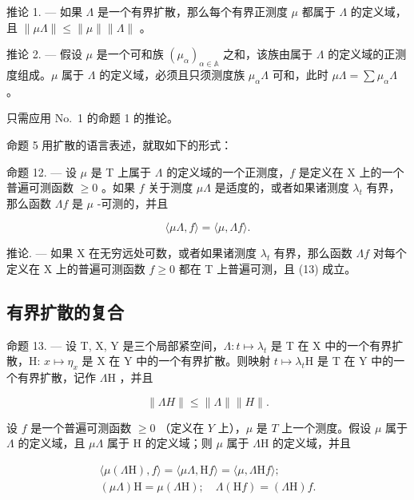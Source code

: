 推论 1. --- 如果 \(\Lambda\) 是一个有界扩散，那么每个有界正测度 \(\mu\) 都属于 \(\Lambda\) 的定义域，且 \(\|\mu\Lambda\| \leqslant \|\mu\|\|\Lambda\|\) 。

推论 2. --- 假设 \(\mu\) 是一个可和族 \((\mu_{\alpha})_{\alpha \in \mathbb{A}}\) 之和，该族由属于 \(\Lambda\) 的定义域的正测度组成。\(\mu\) 属于 \(\Lambda\) 的定义域，必须且只须测度族 \(\mu_{\alpha}\Lambda\) 可和，此时 \(\mu \Lambda = \sum \mu_{\alpha}\Lambda\) 。

只需应用 No.~1 的命题 1 的推论。

命题 5 用扩散的语言表述，就取如下的形式：

命题 12. --- 设 \(\mu\) 是 T 上属于 \(\Lambda\) 的定义域的一个正测度，\(f\) 是定义在 X 上的一个普遍可测函数 \(\geqslant 0\) 。如果 \(f\) 关于测度 \(\mu\Lambda\) 是适度的，或者如果诸测度 \(\lambda_t\) 有界，那么函数 \(\Lambda f\) 是 \(\mu\) -可测的，并且

\[
\langle \mu \Lambda , f \rangle = \langle \mu , \Lambda f \rangle .\tag{13}
\]

推论. --- 如果 X 在无穷远处可数，或者如果诸测度 \(\lambda_{t}\) 有界，那么函数 \(\Lambda f\) 对每个定义在 X 上的普遍可测函数 \(f \geqslant 0\) 都在 T 上普遍可测，且 (13) 成立。

\subsection{有界扩散的复合}

命题 13. --- 设 T, X, Y 是三个局部紧空间，\(\Lambda : t \mapsto \lambda_t\) 是 T 在 X 中的一个有界扩散，H: \(x \mapsto \eta_x\) 是 X 在 Y 中的一个有界扩散。则映射 \(t \mapsto \lambda_t\mathrm{H}\) 是 T 在 Y 中的一个有界扩散，记作 \(\Lambda\mathrm{H}\) ，并且

\[
\| \Lambda H \| \leqslant \| \Lambda \| \| H \|.\tag{14}
\]

设 \(f\) 是一个普遍可测函数 \(\geqslant 0\) （定义在 \(Y\) 上），\(\mu\) 是 \(T\) 上一个测度。假设 \(\mu\) 属于 \(\Lambda\) 的定义域，且 \(\mu \Lambda\) 属于 H 的定义域；则 \(\mu\) 属于 \(\Lambda \mathrm{H}\) 的定义域，并且

\[
\begin{array}{l} \langle \mu (\Lambda \mathrm{H}), f \rangle = \langle \mu \Lambda , \mathrm{H} f \rangle = \langle \mu , \Lambda \mathrm{H} f \rangle ; \\ (\mu \Lambda) \mathrm{H} = \mu (\Lambda \mathrm{H}); \quad \Lambda (\mathrm{H} f) = (\Lambda \mathrm{H}) f. \end{array}\tag{15}
\]

